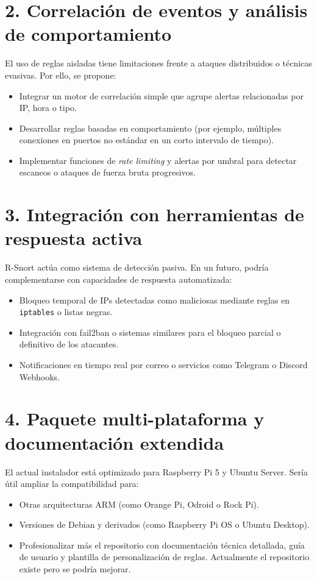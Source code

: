 \documentclass[11pt,a4paper,twoside]{report}
\begin{document}
\section*{2. Correlación de eventos y análisis de comportamiento}

El uso de reglas aisladas tiene limitaciones frente a ataques distribuidos o técnicas evasivas. Por ello, se propone:

\begin{itemize}
	\item Integrar un motor de correlación simple que agrupe alertas relacionadas por IP, hora o tipo.
	\item Desarrollar reglas basadas en comportamiento (por ejemplo, múltiples conexiones en puertos no estándar en un corto intervalo de tiempo).
	\item Implementar funciones de \textit{rate limiting} y alertas por umbral para detectar escaneos o ataques de fuerza bruta progresivos.
\end{itemize}

\section*{3. Integración con herramientas de respuesta activa}

R-Snort actúa como sistema de detección pasiva. En un futuro, podría complementarse con capacidades de respuesta automatizada:

\begin{itemize}
	\item Bloqueo temporal de IPs detectadas como maliciosas mediante reglas en \texttt{iptables} o listas negras.
	\item Integración con fail2ban o sistemas similares para el bloqueo parcial o definitivo de los atacantes.
	\item Notificaciones en tiempo real por correo o servicios como Telegram o Discord Webhooks.
\end{itemize}

\section*{4. Paquete multi-plataforma y documentación extendida}

El actual instalador está optimizado para Raspberry Pi 5 y Ubuntu Server. Sería útil ampliar la compatibilidad para:

\begin{itemize}
	\item Otras arquitecturas ARM (como Orange Pi, Odroid o Rock Pi).
	\item Versiones de Debian y derivados (como Raspberry Pi OS o Ubuntu Desktop).
	\item Profesionalizar más el repositorio con documentación técnica detallada, guía de usuario y plantilla de personalización de reglas. Actualmente el repositorio existe pero se podría mejorar.
\end{itemize}
\end{document}
